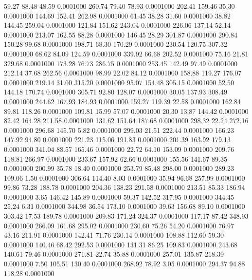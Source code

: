  59.27   88.48   48.59   0.0001000
 260.74   79.40   78.93   0.0001000
 202.41  159.46   35.30   0.0001000
 144.69  152.41  262.98   0.0001000
  61.45   38.28   31.60   0.0001000
  38.82  144.45  259.04   0.0001000
 121.84  151.62  243.04   0.0001000
 226.06  137.14   52.14   0.0001000
 213.07  162.55   88.28   0.0001000
 146.45   28.29  301.87   0.0001000
 290.84  150.28   99.68   0.0001000
 198.71   68.30  170.29   0.0001000
 230.54  120.75  307.32   0.0001000
  68.62   84.09  124.59   0.0001000
 339.92   66.68  202.52   0.0001000
  75.16   21.81  329.68   0.0001000
 173.28   76.73  286.75   0.0001000
 253.45  142.49   97.49   0.0001000
 212.14   37.68  262.56   0.0001000
  98.99   22.02   84.12   0.0001000
 158.88  119.27  176.07   0.0001000
 219.14   31.00  315.20   0.0001000
  95.07  154.48  305.15   0.0001000
  52.50  144.18  170.74   0.0001000
 305.71   92.80  128.07   0.0001000
  30.05  137.93  308.49   0.0001000
 244.62  167.93  184.93   0.0001000
 159.27  119.39   22.58   0.0001000
 162.84   89.81  118.26   0.0001000
 109.81   15.99   57.07   0.0001000
  20.30   13.87  144.42   0.0001000
  82.42  164.28  211.58   0.0001000
 131.62  151.64  187.68   0.0001000
 298.32   22.24  272.16   0.0001000
 296.68  145.70    5.82   0.0001000
 299.03   21.51  222.44   0.0001000
 166.23  147.92   94.80   0.0001000
 221.23  115.06  191.83   0.0001000
 201.39  163.92  179.13   0.0001000
 341.04   88.57  165.46   0.0001000
  22.72   64.10  153.09   0.0001000
 209.76  118.81  266.97   0.0001000
 233.67  157.92   62.66   0.0001000
 155.56  141.67   89.35   0.0001000
 200.99   35.78   18.40   0.0001000
 253.79   85.48  298.00   0.0001000
 289.23  109.06    1.50   0.0001000
 306.64  114.40    8.03   0.0001000
  35.94   96.68  257.99   0.0001000
  99.86   73.28  188.78   0.0001000
 204.36  138.23  291.58   0.0001000
 213.51   85.33  186.94   0.0001000
   3.65  146.42  145.89   0.0001000
  59.37  142.52  317.95   0.0001000
 344.45   25.24    6.31   0.0001000
 344.98   36.54  173.10   0.0001000
  39.63  156.68   89.10   0.0001000
 303.42   17.53  189.78   0.0001000
 209.83  171.24  324.37   0.0001000
 117.17   87.42  348.93   0.0001000
 266.09  161.68  295.02   0.0001000
 230.60   75.26   54.20   0.0001000
  76.97   43.16  211.91   0.0001000
 142.41   71.76  230.14   0.0001000
 108.88  112.60   59.30   0.0001000
 140.46   68.42  292.53   0.0001000
 131.31   86.25  109.83   0.0001000
 243.68  140.61   79.46   0.0001000
 271.81   22.74   35.88   0.0001000
 257.01  135.87  218.39   0.0001000
   7.50  105.51  130.40   0.0001000
 268.92   78.92    3.05   0.0001000
 294.37   94.88  118.28   0.0001000
